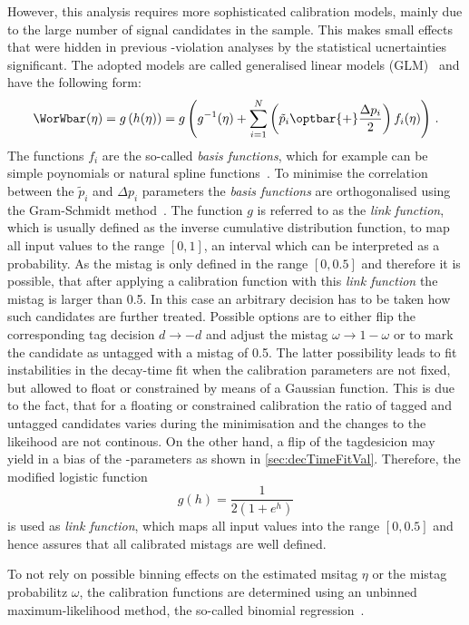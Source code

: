 However, this analysis requires more sophisticated calibration models, mainly due to the large number of signal candidates in the \BdToDpi sample.
This makes small effects that were hidden in previous \CP-violation analyses by the statistical ucnertainties significant.
The adopted models are called generalised linear models (GLM)~\cite{GLM} and have the following form:
\begin{equation}
\WorWbar(\eta) = g\left(h(\eta)\right) = g\left( g^{-1} (\eta) + \sum_{i=1}^{N} \left(\tilde{p}_i \kern 0.0em\optbar{\kern -0.0em +} \frac{\Delta p_i}{2}\right) f_i(\eta)\right)\,.
\end{equation}
The functions $f_i$ are the so-called \emph{basis functions}, which for example can be simple poynomials or natural spline functions~\cite{Nsplines}.
To minimise the correlation between the $\tilde{p}_i$ and $\Delta p_i$ parameters the \emph{basis functions} are orthogonalised using the Gram-Schmidt method~\cite{GramSchmidt}.
The function $g$ is referred to as the \emph{link function}, which is usually defined as the inverse cumulative distribution function, to map all input values to the range $[0,1]$, \ie an interval which can be interpreted as a probability.
As the mistag is only defined in the range $[0, 0.5]$ and therefore it is possible, that after applying a calibration function with this \emph{link function} the mistag is larger than \num{0.5}.
In this case an arbitrary decision has to be taken how such candidates are further treated.
Possible options are to either flip the corresponding tag decision $d\to-d$ and adjust the mistag $\omega\to1-\omega$ or to mark the candidate as untagged with a mistag of \num{0.5}.
The latter possibility leads to fit instabilities in the decay-time fit when the calibration parameters are not fixed, but allowed to float or constrained by means of a Gaussian function.
This is due to the fact, that for a floating or constrained calibration the ratio of tagged and untagged candidates varies during the minimisation and the changes to the likeihood are not continous.
On the other hand, a flip of the tagdesicion may yield in a bias of the \CP-parameters as shown in \cref{sec:decTimeFitVal}.
Therefore, the modified logistic function
\begin{equation}
g(h)=\frac{1}{2\left(1+e^h\right)}
\end{equation}
is used as \emph{link function}, which maps all input values into the range $[0, 0.5]$ and hence assures that all calibrated mistags are well defined.

To not rely on possible binning effects on the estimated msitag $\eta$ or the mistag probabilitz $\omega$, the calibration functions are determined using an unbinned maximum-likelihood method, the so-called binomial regression~\cite{BinRegression}.

